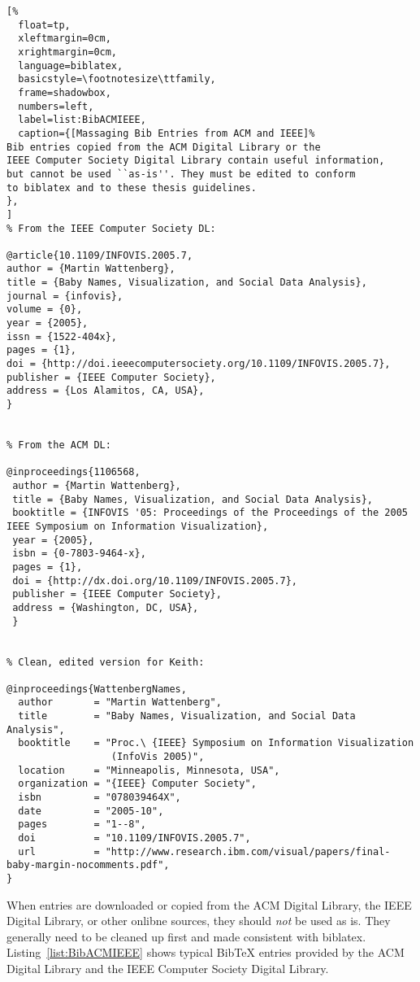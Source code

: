 \begin{lstlisting}[%
  float=tp,
  xleftmargin=0cm,
  xrightmargin=0cm,
  language=biblatex,
  basicstyle=\footnotesize\ttfamily,
  frame=shadowbox,
  numbers=left,
  label=list:BibACMIEEE,
  caption={[Massaging Bib Entries from ACM and IEEE]%
Bib entries copied from the ACM Digital Library or the
IEEE Computer Society Digital Library contain useful information,
but cannot be used ``as-is''. They must be edited to conform
to biblatex and to these thesis guidelines.
},
]
% From the IEEE Computer Society DL:

@article{10.1109/INFOVIS.2005.7,
author = {Martin Wattenberg},
title = {Baby Names, Visualization, and Social Data Analysis},
journal = {infovis},
volume = {0},
year = {2005},
issn = {1522-404x},
pages = {1},
doi = {http://doi.ieeecomputersociety.org/10.1109/INFOVIS.2005.7},
publisher = {IEEE Computer Society},
address = {Los Alamitos, CA, USA},
}


% From the ACM DL:

@inproceedings{1106568,
 author = {Martin Wattenberg},
 title = {Baby Names, Visualization, and Social Data Analysis},
 booktitle = {INFOVIS '05: Proceedings of the Proceedings of the 2005 IEEE Symposium on Information Visualization},
 year = {2005},
 isbn = {0-7803-9464-x},
 pages = {1},
 doi = {http://dx.doi.org/10.1109/INFOVIS.2005.7},
 publisher = {IEEE Computer Society},
 address = {Washington, DC, USA},
 }


% Clean, edited version for Keith:

@inproceedings{WattenbergNames,
  author       = "Martin Wattenberg",
  title        = "Baby Names, Visualization, and Social Data Analysis",
  booktitle    = "Proc.\ {IEEE} Symposium on Information Visualization
                  (InfoVis 2005)",
  location     = "Minneapolis, Minnesota, USA",
  organization = "{IEEE} Computer Society",
  isbn         = "078039464X",
  date         = "2005-10",
  pages        = "1--8",
  doi          = "10.1109/INFOVIS.2005.7",
  url          = "http://www.research.ibm.com/visual/papers/final-baby-margin-nocomments.pdf",
}
\end{lstlisting}



When  entries are downloaded or copied from the ACM
Digital Library, the IEEE Digital Library, or other onlibne sources,
they should \emph{not} be used as is. They generally need to be
cleaned up first and made consistent with biblatex.
Listing~\ref{list:BibACMIEEE} shows typical BibTeX entries provided by
the ACM Digital Library and the IEEE Computer Society Digital Library.


